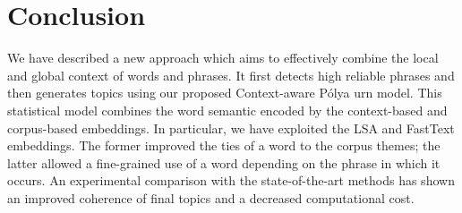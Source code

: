 \documentclass[letterpaper]{article}
\begin{document}
\section{Conclusion}

We have described a new approach which aims to effectively combine the local and global context of words and phrases. It first detects high reliable phrases and then generates topics using our proposed Context-aware P\'{o}lya urn model. This statistical model combines the word semantic encoded by the context-based and corpus-based embeddings. In particular, we have exploited the LSA and FastText embeddings. The former improved the ties of a word to the corpus themes; the latter allowed a fine-grained use of a word depending on the phrase in which it occurs. An experimental comparison with the state-of-the-art methods has shown an improved coherence of final topics and a decreased computational cost.  







%

\end{document}

